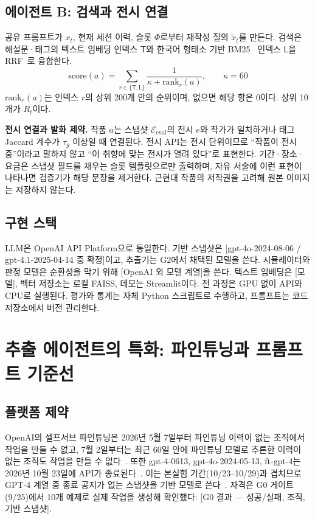\documentclass[10pt,twocolumn,letterpaper]{article}
\newcommand{\fillin}[1]{\textcolor{fillc}{[#1]}}
\newcommand{\sT}{\mathsf{T}}
\newcommand{\sL}{\mathsf{L}}
\newcommand{\cE}{\mathcal{E}}
\begin{document}
\subsection{에이전트 B: 검색과 전시 연결}
\label{sec:retrieval}
공유 프롬프트가 $x_t$, 현재 세션 이력, 슬롯 $\Phi$로부터 재작성 질의 $\tilde{x}_t$를 만든다. 검색은 해설문·태그의 텍스트 임베딩 인덱스 $\sT$와 한국어 형태소 기반 BM25~\cite{robertson2009bm25} 인덱스 $\sL$을 RRF~\cite{cormack2009rrf}로 융합한다.
\begin{equation}
\mathrm{score}(a)=\sum_{r\in\{\sT,\sL\}}\frac{1}{\kappa+\mathrm{rank}_r(a)},\qquad \kappa=60
\label{eq:rrf}
\end{equation}
$\mathrm{rank}_r(a)$는 인덱스 $r$의 상위 200개 안의 순위이며, 없으면 해당 항은 0이다. 상위 10개가 $R_t$이다.

\textbf{전시 연결과 발화 제약.} 작품 $a$는 스냅샷 $\cE_{\mathrm{eval}}$의 전시 $e$와 작가가 일치하거나 태그 Jaccard 계수가 $\tau_g$ 이상일 때 연결된다. 전시 API는 전시 단위이므로 ``작품이 전시 중''이라고 말하지 않고 ``이 취향에 맞는 전시가 열려 있다''로 표현한다. 기간·장소·요금은 스냅샷 필드를 채우는 슬롯 템플릿으로만 출력하며, 자유 서술에 이런 표현이 나타나면 검증기가 해당 문장을 제거한다. 근현대 작품의 저작권을 고려해 원본 이미지는 저장하지 않는다.

\subsection{구현 스택}
\label{sec:stack}
LLM은 OpenAI API Platform으로 통일한다. 기반 스냅샷은 \fillin{gpt-4o-2024-08-06 / gpt-4.1-2025-04-14 중 확정}이고, 추출기는 G2에서 채택된 모델을 쓴다. 시뮬레이터와 판정 모델은 순환성을 막기 위해 \fillin{OpenAI 외 모델 계열}을 쓴다. 텍스트 임베딩은 \fillin{모델}, 벡터 저장소는 로컬 FAISS, 데모는 Streamlit이다. 전 과정은 GPU 없이 API와 CPU로 실행된다. 평가와 통계는 자체 Python 스크립트로 수행하고, 프롬프트는 코드 저장소에서 버전 관리한다.

\section{추출 에이전트의 특화: 파인튜닝과 프롬프트 기준선}
\label{sec:ft}

\subsection{플랫폼 제약}
OpenAI의 셀프서브 파인튜닝은 2026년 5월 7일부터 파인튜닝 이력이 없는 조직에서 작업을 만들 수 없고, 7월 2일부터는 최근 60일 안에 파인튜닝 모델로 추론한 이력이 없는 조직도 작업을 만들 수 없다~\cite{openai_deprecations}. 또한 gpt-4-0613, gpt-4o-2024-05-13, ft-gpt-4는 2026년 10월 23일에 API가 종료된다~\cite{openai_deprecations}. 이는 본실험 기간(10/23–10/29)과 겹치므로 GPT-4 계열 중 종료 공지가 없는 스냅샷을 기반 모델로 쓴다~\cite{openai_gpt4o_ft}. 자격은 G0 게이트(9/25)에서 10개 예제로 실제 작업을 생성해 확인했다: \fillin{G0 결과 — 성공/실패, 조직, 기반 스냅샷}.
\end{document}
